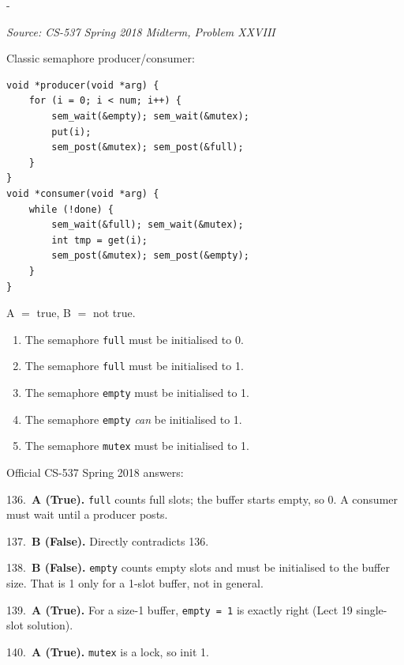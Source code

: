 \documentclass[11pt,a4paper]{article}
\makeatletter
\newcommand{\keepspace}[1]{\par\penalty-100\begingroup
  \setlength{\dimen@}{#1}\dimen@ii\pagegoal\advance\dimen@ii-\pagetotal
  \ifdim\dimen@>\dimen@ii\ifdim\dimen@ii>\z@\vfil\fi\break\fi\endgroup}
\newcounter{qn}[section]
\newenvironment{Qn}[4]{%
  \refstepcounter{qn}\keepspace{7\baselineskip}%
  \begin{tcolorbox}[qboxstyle, title={Q\thesection.\theqn\ \ [#1 \textbar\ #2]\ \ #4}]%
  {\footnotesize\color{g3}\textit{Source: #3}}\par\smallskip%
}{%
  \end{tcolorbox}%
}
\newenvironment{Sol}{%
  \begin{tcolorbox}[sboxstyle, title={Solution}]%
}{%
  \end{tcolorbox}\vspace{0.35em}%
}
\makeatother
\begin{document}
\begin{Qn}{Easy-Medium}{Lect 19}{CS-537 Spring 2018 Midterm, Problem XXVIII}{T/F: producer/consumer initial values}
Classic semaphore producer/consumer:
\begin{lstlisting}[numbers=none]
void *producer(void *arg) {
    for (i = 0; i < num; i++) {
        sem_wait(&empty); sem_wait(&mutex);
        put(i);
        sem_post(&mutex); sem_post(&full);
    }
}
void *consumer(void *arg) {
    while (!done) {
        sem_wait(&full); sem_wait(&mutex);
        int tmp = get(i);
        sem_post(&mutex); sem_post(&empty);
    }
}
\end{lstlisting}
A $=$ true, B $=$ not true.

\begin{enumerate}
  \item[136.] The semaphore \texttt{full} must be initialised to 0.
  \item[137.] The semaphore \texttt{full} must be initialised to 1.
  \item[138.] The semaphore \texttt{empty} must be initialised to 1.
  \item[139.] The semaphore \texttt{empty} \emph{can} be initialised to 1.
  \item[140.] The semaphore \texttt{mutex} must be initialised to 1.
\end{enumerate}
\end{Qn}
\begin{Sol}
Official CS-537 Spring 2018 answers:

136.~\textbf{A (True).} \texttt{full} counts full slots; the buffer
starts empty, so 0. A consumer must wait until a producer posts.

137.~\textbf{B (False).} Directly contradicts 136.

138.~\textbf{B (False).} \texttt{empty} counts empty slots and must be
initialised to the buffer size. That is 1 only for a 1-slot buffer, not
in general.

139.~\textbf{A (True).} For a size-1 buffer, \texttt{empty = 1} is
exactly right (Lect 19 single-slot solution).

140.~\textbf{A (True).} \texttt{mutex} is a lock, so init 1.
\end{Sol}
\end{document}
